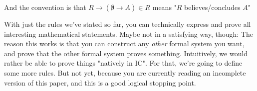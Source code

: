 \documentclass{article}
\begin{document}
%


  And the convention is that $R \to (\emptyset \to A) \in R$ means "$R$ believes/concludes $A$"
%

  \iffalse
  \begin{align*}
    \tag{base case}
    &\vdash (R \concludes \emptyset) \\
    \tag{select}
    (R \concludes A), (B \in A) &\vdash (R \concludes \singleton{B}) \\
    \tag{union introduction}
    (R \concludes A), (R \concludes B) &\vdash (R \concludes (A \union B)) \\
    \tag{rules do what they say}
    ((A \infrule B) \in R), (R \concludes A) &\vdash (R \concludes B) \\
  \end{align*}
  \fi  
    \newcommand{\deduction}{\mathbb{D}}
  
  With just the rules we've stated so far, you can technically express and prove all interesting mathematical statements. Maybe not in a satisfying way, though: The reason this works is that you can construct any \emph{other} formal system you want, and prove that the other formal system proves something. Intuitively, we would rather be able to prove things "natively in IC". For that, we're going to define some more rules. But not yet, because you are currently reading an incomplete version of this paper, and this is a good logical stopping point.
  
\end{document}

